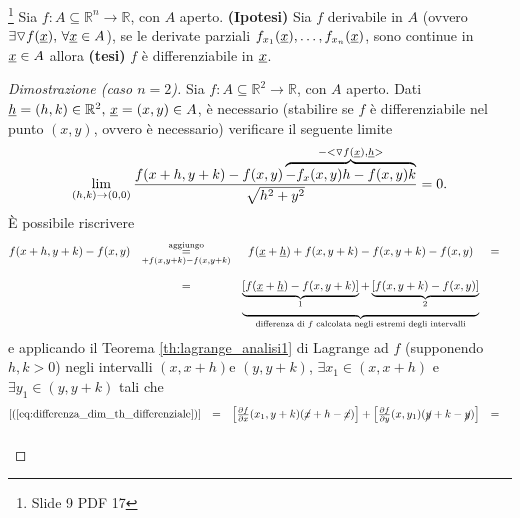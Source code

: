 \begin{theorem}\label{th:del_differenziale}\footnote{Slide 9 PDF 17}
	Sia $f:A\subseteq\mathbb{R}^n\rightarrow\mathbb{R}$, con $A$ aperto. \textbf{(Ipotesi)} Sia $f$ derivabile in $A$ (ovvero $\exists\triangledown f(\uline x),\, \forall\uline x\in A$), se le derivate parziali $f_{x_1}(\uline x),\hdots, f_{x_n}(\uline x)$, sono continue in $\uline x\in A$ allora \textbf{(tesi)} $f$ è differenziabile in $\uline x$.
\end{theorem}
\begin{proof}[Dimostrazione (caso $n=2$)]
	Sia $f:A\subseteq \mathbb{R}^2\rightarrow\mathbb{R}$, con $A$ aperto. Dati $\uline h = (h,k)\in\mathbb{R}^2,\, \uline x=(x,y)\in A$, è necessario (stabilire se $f$ è differenziabile nel punto $(x,y)$, ovvero è necessario) verificare il seguente limite %
	\begin{equation}\label{eq:rapporto_differenziabilita_dim_differenziale}
		\lim\limits_{(h,k)\rightarrow(0,0)} \frac{f(x+h,y+k)-f(x,y)\overbrace{-f_x(x,y)h-f(x,y)k}^{-<\triangledown f(\uline x),\uline h>}}{\sqrt{h^2+y^2}} = 0.
	\end{equation}
	È possibile riscrivere
	\begin{equation}\label{eq:differenza_dim_th_differenziale}
		\begin{matrix}
			f(x+h,y+k) - f(x,y) &\underset{+f(x,y+k)-f(x,y+k)}{\overset{\text{aggiungo}}{=}}& f(\uline x + \uline h) + f(x,y+k) - f(x,y+k) - f(x,y) &=&\\\\
			&=& \underbrace{\underbrace{[f(\uline x + \uline h) - f(x,y+k)]}_{\footnotemark} + \underbrace{[f(x,y+k) - f(x,y)]}_{\footnotemark}}_{\text{differenza di $f$ calcolata negli estremi degli intervalli}}
		\end{matrix}
	\end{equation}
	e applicando il Teorema \ref{th:lagrange_analisi1} di Lagrange ad $f$ (supponendo $h,k>0$) negli intervalli $(x,x+h)$\footnotemark e $(y,y+k)$\footnotemark, $\exists x_1\in(x,x+h)$ e $\exists y_1\in(y,y+k)$ tali che
	\begin{equation}\label{eq:applicazione_lagrange_dim_differenziale}
		\begin{matrix}
			[(\ref{eq:differenza_dim_th_differenziale})] &=& \left[\frac{\partial f}{\partial x}(x_1, y + k) (\cancel{x} + h - \cancel{x})\right] + \left[\frac{\partial f}{\partial y}(x,y_1)(\cancel{y} + k -\cancel{y})\right]&=&\\\\

\end{matrix}
\end{equation}
\end{proof}
